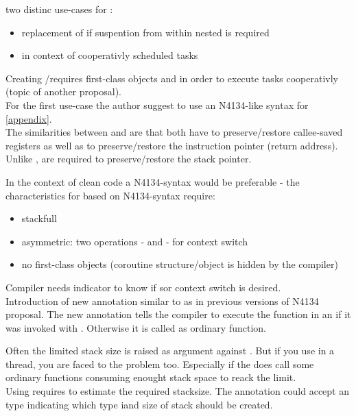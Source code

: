 two distinc use-cases for \sfcoros:
\begin{itemize}
    \item replacement of \slcoros if suspention from within nested \cstack is
          required
    \item in context of cooperativly scheduled tasks
\end{itemize}

Creating \fibers/\uthreads requires first-class objects and \sycoros in order
to execute tasks cooperativly (topic of another proposal).\\
For the first use-case the author suggest to use an N4134-like syntax for
\sfcoros\ref{appendix}.\\
The similarities between \sfcoros and \slcoros are that both have to
preserve/restore callee-saved registers as well as to preserve/restore
the instruction pointer (return address).\\
Unlike \sless, \sfcoro are required to preserve/restore the stack pointer.

In the context of clean code a \sfull N4134-syntax would be preferable - the
characteristics for \sfcoros based on N4134-syntax require:
\begin{itemize}
    \item stackfull
    \item asymmetric: two operations - \await and \yield - for context switch
    \item no first-class objects (coroutine structure/object is hidden by the
          compiler)
\end{itemize}

Compiler needs indicator to know if s\sless or \sfull context switch is desired.\\
Introduction of new annotation \sfanno similar to \resumable as in previous versions
of N4134 proposal. The new annotation tells the compiler to execute the function in
an \sfcoro if it was invoked with \await. Otherwise it is called as ordinary function.\\

Often the limited stack size is raised as argument against \sfcoros. But if you use
\slcoros in a thread, you are faced to the problem too. Especially if the \slcoros
does call some ordinary functions consuming enought stack space to reack the limit.\\
Using \sfcoros requires to estimate the required stacksize. The annotation could accept
an type indicating which type iand size of stack should be created.\\
